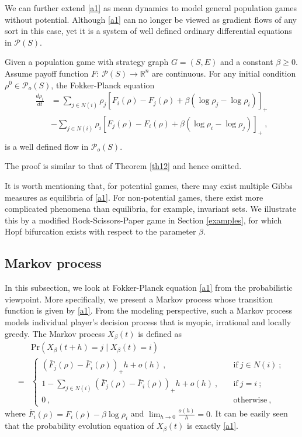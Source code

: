 \documentclass[11pt,reqno]{amsart}
\begin{document}
We can further extend \eqref{a1} as mean dynamics to model general population games without potential. Although \eqref{a1} can no longer be viewed as gradient flows of any sort in this case, yet it is a system of well defined ordinary differential equations in $\mathcal{P}(S)$. 
\begin{corollary}
Given a population game with strategy graph $G=(S, E)$ and a constant $\beta\geq 0$.  
Assume payoff function $F:~\mathcal{P}(S)\rightarrow \mathbb{R}^n$ are continuous. For any  initial condition $\rho^0\in \mathcal{P}_o(S)$, the Fokker-Planck equation 
\begin{equation*}
\begin{split}
\frac{ d\rho_i}{dt}&=\sum_{j\in N(i)} \rho_j[ F_i(\rho)- F_j(\rho)+\beta(\log\rho_j-\log\rho_i)]_+\\
&-\sum_{j\in N(i)}\rho_{i}[ F_j(\rho)- F_i(\rho)+\beta(\log\rho_i-\log\rho_j)]_+ \ ,\\
\end{split}
\end{equation*}
is a well defined flow in $\mathcal{P}_o(S)$. 
\end{corollary}  
The proof is similar to that of Theorem \ref{th12} and hence omitted. 

It is worth mentioning that, for potential games, there may exist multiple Gibbs measures as equilibria of \eqref{a1}. For non-potential games, there
exist more complicated phenomena than equilibria, for example, invariant sets. We illustrate this by a modified Rock-Scissors-Paper game in Section
\ref{examples}, for which Hopf bifurcation exists with respect to the  parameter $\beta$.  
\subsection{Markov process}\label{Markov_process}
In this subsection, we look at Fokker-Planck equation \eqref{a1} from the probabilistic viewpoint. More specifically, we present
a Markov process whose transition function is given by \eqref{a1}.   
From the modeling perspective, such a Markov process models individual player's
decision process that is myopic, irrational and locally greedy. The Markov process $X_{\beta}(t)$
is defined as
\begin{equation}\label{Markov}
\begin{split}
&\textrm{Pr}(X_\beta(t+h)=j\mid X_\beta(t)=i)\\
=&\begin{cases}
( \bar F_j(\rho)- \bar F_i(\rho))_+h+o(h)\ , \quad&\textrm{if}~ j\in N(i)\ ;\\
1-\sum_{j\in N(i)}(\bar F_j(\rho)-\bar F_i(\rho))_+h+o(h)\ ,\quad &\textrm{if}~ j=i\ ;\\
0\ ,\quad &\textrm{otherwise}\ ,
\end{cases}
\end{split}
\end{equation}
where $\bar F_i(\rho)=F_i(\rho)-\beta\log\rho_i$ and $\lim_{h\rightarrow 0}\frac{o(h)}{h}=0$. It can be easily seen that the probability evolution equation of $X_{\beta}(t)$ is exactly \eqref{a1}.
\end{document}
